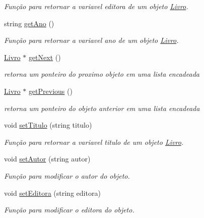 \begin{DoxyCompactItemize}
\begin{DoxyCompactList}\small\item\em Função para retornar a variavel editora de um objeto \hyperlink{class_livro}{Livro}. \end{DoxyCompactList}\item 
string \hyperlink{class_livro_aa5ad8529cea36c240e19a063da9fceb8}{get\+Ano} ()
\begin{DoxyCompactList}\small\item\em Função para retornar a variavel ano de um objeto \hyperlink{class_livro}{Livro}. \end{DoxyCompactList}\item 
\hyperlink{class_livro}{Livro} $\ast$ \hyperlink{class_livro_ac7fc0b0494f653cacb64f51f9103f1b5}{get\+Next} ()
\begin{DoxyCompactList}\small\item\em retorna um ponteiro do proximo objeto em uma lista encadeada \end{DoxyCompactList}\item 
\hyperlink{class_livro}{Livro} $\ast$ \hyperlink{class_livro_a742900b43e07423fd79e2a03dab5e12b}{get\+Previous} ()
\begin{DoxyCompactList}\small\item\em retorna um ponteiro do objeto anterior em uma lista encadeada \end{DoxyCompactList}\item 
void \hyperlink{class_livro_adbae26ce6938e1f56ed6d88b458351c7}{set\+Titulo} (string titulo)
\begin{DoxyCompactList}\small\item\em Função para retornar a variavel titulo de um objeto \hyperlink{class_livro}{Livro}. \end{DoxyCompactList}\item 
void \hyperlink{class_livro_ab6979584fef48cc9b2ca4dc0359dd69d}{set\+Autor} (string autor)
\begin{DoxyCompactList}\small\item\em Função para modificar o autor do objeto. \end{DoxyCompactList}\item 
void \hyperlink{class_livro_a872239a75a304f78e8b06fd3a5cb7b32}{set\+Editora} (string editora)
\begin{DoxyCompactList}\small\item\em Função para modificar o editora do objeto. \end{DoxyCompactList}\item 

\end{DoxyCompactItemize}
